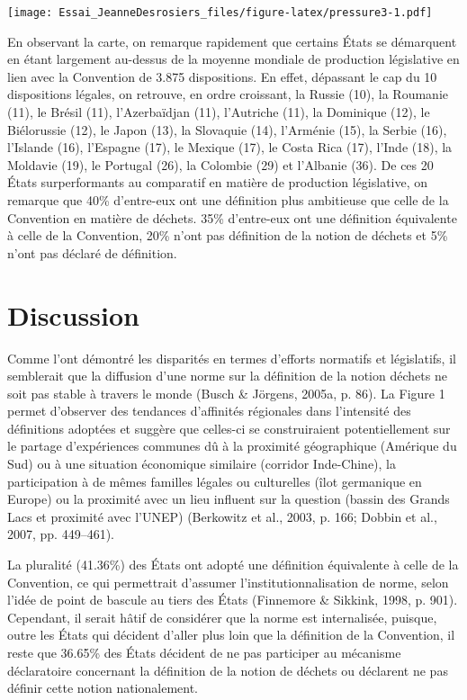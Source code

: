 \documentclass[12pt]{ulaval}
\begin{document}
\texttt{[image: Essai\_JeanneDesrosiers\_files/figure-latex/pressure3-1.pdf]}

En observant la carte, on remarque rapidement que certains États se démarquent en étant largement au-dessus de la moyenne mondiale de production législative en lien avec la Convention de 3.875 dispositions. En effet, dépassant le cap du 10 dispositions légales, on retrouve, en ordre croissant, la Russie (10), la Roumanie (11), le Brésil (11), l'Azerbaïdjan (11), l'Autriche (11), la Dominique (12), le Biélorussie (12), le Japon (13), la Slovaquie (14), l'Arménie (15), la Serbie (16), l'Islande (16), l'Espagne (17), le Mexique (17), le Costa Rica (17), l'Inde (18), la Moldavie (19), le Portugal (26), la Colombie (29) et l'Albanie (36). De ces 20 États surperformants au comparatif en matière de production législative, on remarque que 40\% d'entre-eux ont une définition plus ambitieuse que celle de la Convention en matière de déchets. 35\% d'entre-eux ont une définition équivalente à celle de la Convention, 20\% n'ont pas définition de la notion de déchets et 5\% n'ont pas déclaré de définition.

\section{Discussion}\label{discussion}

Comme l'ont démontré les disparités en termes d'efforts normatifs et législatifs, il semblerait que la diffusion d'une norme sur la définition de la notion déchets ne soit pas stable à travers le monde (Busch \& Jörgens, 2005a, p. 86). La Figure 1 permet d'observer des tendances d'affinités régionales dans l'intensité des définitions adoptées et suggère que celles-ci se construiraient potentiellement sur le partage d'expériences communes dû à la proximité géographique (Amérique du Sud) ou à une situation économique similaire (corridor Inde-Chine), la participation à de mêmes familles légales ou culturelles (îlot germanique en Europe) ou la proximité avec un lieu influent sur la question (bassin des Grands Lacs et proximité avec l'UNEP) (Berkowitz et al., 2003, p. 166; Dobbin et al., 2007, pp. 449--461).

La pluralité (41.36\%) des États ont adopté une définition équivalente à celle de la Convention, ce qui permettrait d'assumer l'institutionnalisation de norme, selon l'idée de point de bascule au tiers des États (Finnemore \& Sikkink, 1998, p. 901). Cependant, il serait hâtif de considérer que la norme est internalisée, puisque, outre les États qui décident d'aller plus loin que la définition de la Convention, il reste que 36.65\% des États décident de ne pas participer au mécanisme déclaratoire concernant la définition de la notion de déchets ou déclarent ne pas définir cette notion nationalement.
\end{document}
